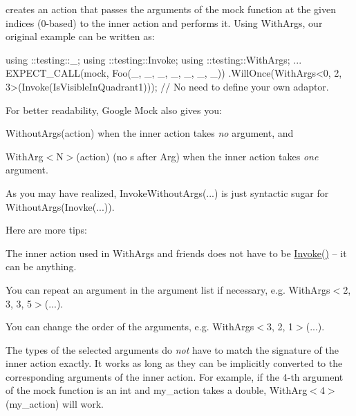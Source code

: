 creates an action that passes the arguments of the mock function at the given indices (0-\/based) to the inner {\ttfamily action} and performs it. Using {\ttfamily With\+Args}, our original example can be written as\+:


\begin{DoxyCode}
using ::testing::\_;
using ::testing::Invoke;
using ::testing::WithArgs;
...
  EXPECT\_CALL(mock, Foo(\_, \_, \_, \_, \_, \_, \_))
      .WillOnce(WithArgs<0, 2, 3>(Invoke(IsVisibleInQuadrant1)));
      // No need to define your own adaptor.
\end{DoxyCode}


For better readability, Google Mock also gives you\+:


\begin{DoxyItemize}
\item {\ttfamily Without\+Args(action)} when the inner {\ttfamily action} takes {\itshape no} argument, and
\item {\ttfamily With\+Arg$<$N$>$(action)} (no {\ttfamily s} after {\ttfamily Arg}) when the inner {\ttfamily action} takes {\itshape one} argument.
\end{DoxyItemize}

As you may have realized, {\ttfamily Invoke\+Without\+Args(...)} is just syntactic sugar for {\ttfamily Without\+Args(Inovke(...))}.

Here are more tips\+:


\begin{DoxyItemize}
\item The inner action used in {\ttfamily With\+Args} and friends does not have to be {\ttfamily \hyperlink{namespacetesting_a12aebaf8363d49a383047529f798b694}{Invoke()}} -- it can be anything.
\item You can repeat an argument in the argument list if necessary, e.\+g. {\ttfamily With\+Args$<$2, 3, 3, 5$>$(...)}.
\item You can change the order of the arguments, e.\+g. {\ttfamily With\+Args$<$3, 2, 1$>$(...)}.
\item The types of the selected arguments do {\itshape not} have to match the signature of the inner action exactly. It works as long as they can be implicitly converted to the corresponding arguments of the inner action. For example, if the 4-\/th argument of the mock function is an {\ttfamily int} and {\ttfamily my\+\_\+action} takes a {\ttfamily double}, {\ttfamily With\+Arg$<$4$>$(my\+\_\+action)} will work.
\end{DoxyItemize}

